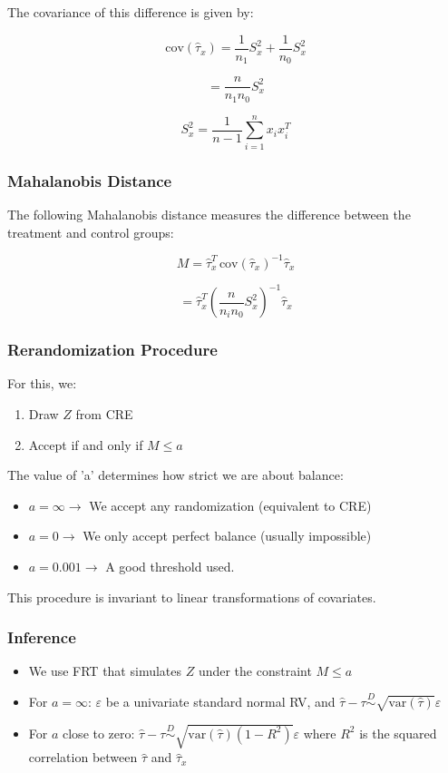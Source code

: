 The covariance of this difference is given by:

\[
\text{cov}(\hat{\tau}_x) = \frac{1}{n_1} S_x^2 + \frac{1}{n_0} S_x^2 
\]

\[
= \frac{n}{n_1 n_0} S_x^2
\]

\[
S_x^2 = \frac{1}{n-1} \sum_{i=1}^{n} x_i x_i^T
\]

\subsubsection{Mahalanobis Distance}

The following Mahalanobis distance measures the difference between the treatment and control groups:

\[
M = \hat{\tau}_x^T \, \text{cov}(\hat{\tau}_x)^{-1} \hat{\tau}_x 
\]

\[
= \hat{\tau}_x^T \left( \frac{n}{n_i n_0} S_x^2 \right)^{-1} \hat{\tau}_x 
\]

\subsubsection{Rerandomization Procedure}

For this, we:
\begin{enumerate}
    \item Draw $Z$ from CRE
    \item Accept if and only if $M \leq a$
\end{enumerate}

The value of 'a' determines how strict we are about balance:
\begin{itemize}
    \item $a = \infty \rightarrow$ We accept any randomization (equivalent to CRE)
    \item $a = 0 \rightarrow$ We only accept perfect balance (usually impossible)
    \item $a = 0.001 \rightarrow$ A good threshold used.
\end{itemize}

This procedure is invariant to linear transformations of covariates.

\subsubsection{Inference}

\begin{itemize}
    \item We use FRT that simulates $Z$ under the constraint $M \leq a$
    \item For $a = \infty$: $\varepsilon$ be a univariate standard normal RV, and $\hat{\tau} - \tau \stackrel{D}{\sim} \sqrt{\text{var}(\hat{\tau})} \varepsilon$
    \item For $a$ close to zero: $\hat{\tau} - \tau \stackrel{D}{\sim} \sqrt{\text{var}(\hat{\tau})(1-R^2)} \varepsilon$ where $R^2$ is the squared correlation between $\hat{\tau}$ and $\hat{\tau}_x$
\end{itemize}

